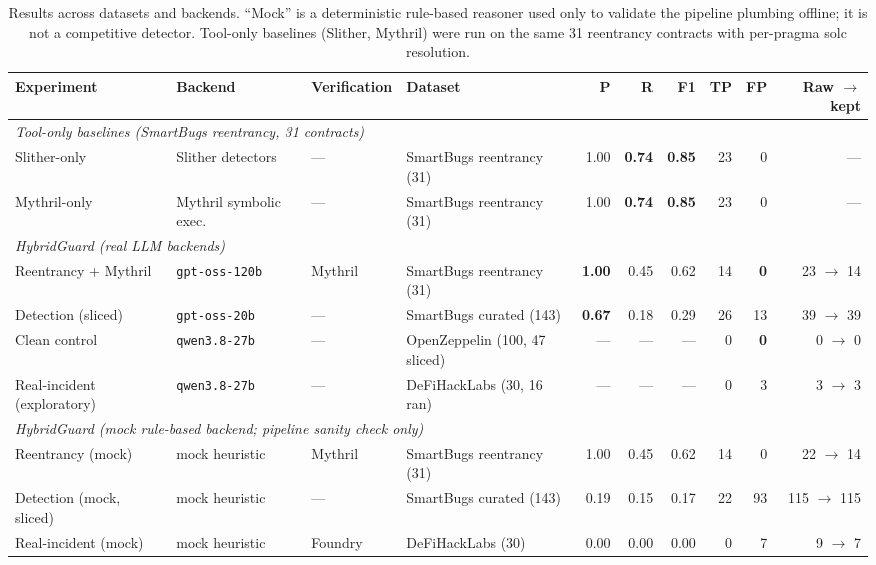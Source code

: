 \documentclass[conference]{IEEEtran}
\newcommand{\system}{HybridGuard}
\begin{document}
\begin{table}[t]
\centering
\caption{Results across datasets and backends. ``Mock'' is a deterministic rule-based reasoner used
only to validate the pipeline plumbing offline; it is not a competitive detector. Tool-only
baselines (Slither, Mythril) were run on the same 31 reentrancy contracts with per-pragma solc
resolution.}\label{tab:main}
\begin{tabular}{llllrrrrrr}
\toprule
Experiment & Backend & Verification & Dataset & P & R & F1 & TP & FP & Raw $\rightarrow$ kept \\
\midrule
\multicolumn{10}{l}{\emph{Tool-only baselines (SmartBugs reentrancy, 31 contracts)}} \\
Slither-only             & Slither detectors      & ---     & SmartBugs reentrancy (31) & 1.00 & \textbf{0.74} & \textbf{0.85} & 23 & 0 & --- \\
Mythril-only             & Mythril symbolic exec. & ---     & SmartBugs reentrancy (31) & 1.00 & \textbf{0.74} & \textbf{0.85} & 23 & 0 & --- \\
\midrule
\multicolumn{10}{l}{\emph{\system{} (real LLM backends)}} \\
Reentrancy + Mythril     & \texttt{gpt-oss-120b}  & Mythril & SmartBugs reentrancy (31) & \textbf{1.00} & 0.45 & 0.62 & 14 & \textbf{0} & 23 $\rightarrow$ 14 \\
Detection (sliced)       & \texttt{gpt-oss-20b}   & ---     & SmartBugs curated (143)   & \textbf{0.67} & 0.18 & 0.29 & 26 & 13 & 39 $\rightarrow$ 39 \\
Clean control            & \texttt{qwen3.8-27b}   & ---     & OpenZeppelin (100, 47 sliced) & ---  & ---  & ---  & 0  & \textbf{0} & 0 $\rightarrow$ 0 \\
Real-incident (exploratory) & \texttt{qwen3.8-27b} & ---    & DeFiHackLabs (30, 16 ran) & ---  & ---  & ---  & 0  & 3  & 3 $\rightarrow$ 3 \\
\midrule
\multicolumn{10}{l}{\emph{\system{} (mock rule-based backend; pipeline sanity check only)}} \\
Reentrancy (mock)        & mock heuristic         & Mythril & SmartBugs reentrancy (31) & 1.00 & 0.45 & 0.62 & 14 & 0 & 22 $\rightarrow$ 14 \\
Detection (mock, sliced) & mock heuristic         & ---     & SmartBugs curated (143)   & 0.19 & 0.15 & 0.17 & 22 & 93 & 115 $\rightarrow$ 115 \\
Real-incident (mock)     & mock heuristic         & Foundry & DeFiHackLabs (30)         & 0.00 & 0.00 & 0.00 & 0  & 7  & 9 $\rightarrow$ 7 \\
\bottomrule
\end{tabular}
\end{table}
\end{document}
